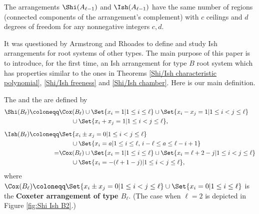 \begin{theorem}\label{Shi/Ish chamber}
The arrangements $\Shi(A_{\ell-1})$ and $\Ish(A_{\ell-1})$ have the same number of regions (connected components of the arrangement's complement) with $c$ ceilings and $d$ degrees of freedom for any nonnegative integers $c,d$. 
\end{theorem}

It was questioned by Armstrong and Rhoades  \cite[\S5.3(6)]{AR12} to define and study Ish arrangements for root systems of other types. 
The main purpose of this paper is to introduce, for the first time, an Ish arrangement for  type $B$ root system which has  properties similar to the ones in Theorems \ref{Shi/Ish characteristic polynomial}, \ref{Shi/Ish freeness} and \ref{Shi/Ish chamber}. 
Here is our main definition. 

\begin{definition}
\label{def:Shi-Ish-B}
The  and the  are defined by 
\begin{equation*}
\label{eq:BSI}
\begin{aligned}
\Shi(B_\ell) \coloneqq&\Cox(B_\ell)  \cup  \Set{ x_{i} = 1 | 1 \leq i  \leq \ell } \cup  \Set{ x_{i}- x_{j}= 1 | 1 \leq i < j \leq \ell} \\ 
& \qquad\cup  \Set{x_{i}+x_{j}= 1 | 1 \leq i < j \leq \ell}, \\[2mm]
\Ish(B_\ell) \coloneqq& \Set{x_{i}\pm x_{j} = 0 | 1 \leq i < j \leq \ell} \\
& \qquad \cup \Set{x_{i} = a | 1 \leq i \leq \ell, \,i-\ell \leq a \leq \ell-i+1 }\\
=& \Cox(B_\ell)  \cup  \Set{ x_{i} = 1 |1 \leq i  \leq \ell} \cup  \Set{ x_{i} = \ell+2-j  | 1 \leq i < j \leq \ell}\\ 
& \qquad\cup  \Set{ x_{i} =  -(\ell+1-j )| 1 \leq i < j \leq \ell},
\end{aligned}
\end{equation*}
where $\Cox(B_\ell) \coloneqq \Set{ x_{i}\pm x_{j}=0 | 1 \leq i < j \leq \ell} \cup \Set{ x_{i} = 0 |  1 \leq i  \leq \ell} $ is the  \textbf{Coxeter arrangement of type $B_\ell$}. 
(The case when $\ell=2$ is depicted in Figure \ref{fig:Shi Ish B2}.)
\end{definition}


